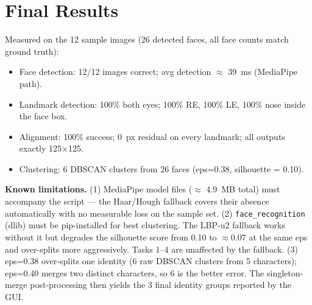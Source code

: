 \section{Final Results}
Measured on the 12 sample images (26 detected faces, all face counts match
ground truth):
\begin{itemize}
  \item Face detection: 12/12 images correct; avg detection $\approx$ 39~ms
        (MediaPipe path).
  \item Landmark detection: 100\% both eyes; 100\% RE, 100\% LE, 100\% nose
        inside the face box.
  \item Alignment: 100\% success; 0~px residual on every landmark; all outputs
        exactly 125$\times$125.
  \item Clustering: 6 DBSCAN clusters from 26 faces (eps=0.38, silhouette
        = 0.10).
\end{itemize}

\textbf{Known limitations.}
(1) MediaPipe model files ($\approx$ 4.9~MB total) must accompany the script
--- the Haar/Hough fallback covers their absence automatically with no
measurable loss on the sample set.
(2) \texttt{face\_recognition} (dlib) must be pip-installed for best clustering.
The LBP-u2 fallback works without it but degrades the silhouette score from
0.10 to $\approx 0.07$ at the same eps and over-splits more aggressively.
Tasks 1--4 are unaffected by the fallback.
(3) eps=0.38 over-splits one identity (6 raw DBSCAN clusters from 5
characters); eps=0.40 merges two distinct characters, so 6 is the better
error. The singleton-merge post-processing then yields the 3 final
identity groups reported by the GUI.

